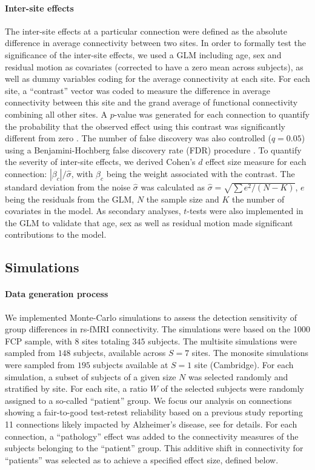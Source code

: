 \documentclass[authoryear]{elsarticle}
\begin{document}
\paragraph{Inter-site effects} The inter-site effects at a particular connection were defined as the absolute difference in average connectivity between two sites. In order to formally test the significance of the inter-site effects, we used a GLM including age, sex and residual motion as covariates (corrected to have a zero mean across subjects), as well as dummy variables coding for the average connectivity at each site. For each site, a ``contrast'' vector was coded to measure the difference in average connectivity between this site and the grand average of functional connectivity combining all other sites. A $p$-value was generated for each connection to quantify the probability that the observed effect using this contrast was significantly different from zero \citep{Worsley1995}. The number of false discovery was also controlled ($q=0.05$) using a Benjamini-Hochberg false discovery rate (FDR) procedure \citep{Benjamini1995}.  To quantify the severity of inter-site effects, we derived Cohen's $d$ effect size measure for each connection: $|\beta_c|/\hat{\sigma}$, with $\beta_c$ being the weight associated with the contrast. The standard
deviation from the noise $\hat{\sigma}$ was calculated as $\hat{\sigma}=\sqrt{\sum{e^{2}}/(N-K)}$, $e$ being the residuals from the GLM, $N$
the sample size and $K$ the number of covariates in the model. As secondary analyses, $t$-tests were also implemented in the GLM to validate that age, sex as well as residual motion made significant contributions to the model. 

\subsection{Simulations}

\paragraph{Data generation process}
We implemented Monte-Carlo simulations to assess the detection sensitivity of group differences in rs-fMRI connectivity. The simulations were based on the 1000 FCP sample, with 8 sites totaling $345$ subjects. The multisite simulations were sampled from $148$ subjects, available across $S=7$ sites. The monosite simulations were sampled from $195$ subjects available at $S=1$ site (Cambridge). For each simulation, a subset of subjects of a given size $N$ was selected randomly and stratified by site. For each site, a ratio $W$ of the selected subjects were randomly assigned to a so-called  ``patient'' group. 
We focus our analysis on connections showing a fair-to-good test-retest reliability based on a previous study reporting 11 connections likely impacted by Alzheimer's disease, see \cite{Orban2015} for details. For each connection, a ``pathology'' effect was added to the connectivity measures of the subjects belonging to the ``patient'' group. This additive shift in connectivity for ``patients'' was selected as to achieve a specified effect size, defined below. 
\end{document}
